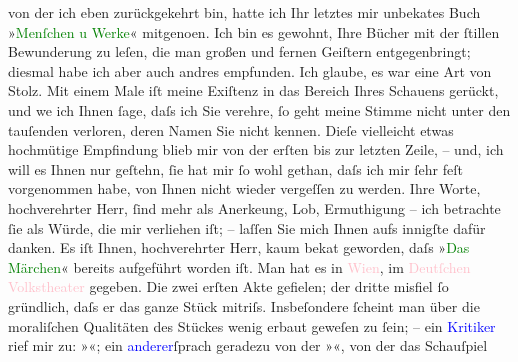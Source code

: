                     von der ich eben zurückgekehrt bin, hatte ich Ihr letztes mir unbeka{\geminationn}tes Buch »\textcolor{green}{Menſchen u
                        Werke}{}\ledrightnote{\textcolor{green}{Menschen und Werke}}« mitgeno{\geminationm}en. Ich bin es
                    gewohnt, Ihre Bücher mit der ſtillen Bewunderung zu leſen, die man großen und
                    fernen Geiſtern entgegen{\pb}bringt; diesmal
                    habe ich aber auch andres empfunden. Ich glaube, es war eine Art von Stolz. Mit
                    einem Male iſt meine Exiſtenz in das Bereich Ihres Schauens gerückt, und we{\geminationn} ich Ihnen ſage, daſs ich Sie verehre, ſo geht
                    meine Stimme nicht unter den tauſenden verloren, deren Namen Sie nicht kennen.
                    Dieſe vielleicht etwas hochmütige Empfindung blieb mir {\pb}von der erſten bis zur letzten Zeile, –
                    und, ich will es Ihnen nur geſtehn, ſie hat mir ſo wohl gethan, daſs ich mir
                    ſehr feſt vorgenommen habe, von Ihnen nicht wieder vergeſſen zu werden. Ihre
                    Worte, hochverehrter Herr, ſind mehr als Anerke{\geminationn}ung, Lob, Ermuthigung – ich betrachte ſie als Würde, die mir verliehen iſt; –
                    laſſen Sie mich Ihnen aufs innigſte dafür {\pb}danken.\pend
           \pstart
           Es iſt Ihnen, hochverehrter Herr, kaum beka{\geminationn}t
                    geworden, daſs »\textcolor{green}{Das Märchen}{}\ledrightnote{\textcolor{green}{Das Märchen. Schauspiel in drei Aufzügen}}« bereits
                    aufgeführt worden iſt. Man hat es in \textcolor{pink}{Wien}{}\ledrightnote{\textcolor{pink}{Wien}}, im
                        \textcolor{pink}{Deutſchen Volkstheater}{}\ledrightnote{\textcolor{pink}{Volkstheater}} gegeben. Die zwei
                    erſten Akte gefielen; der dritte misfiel ſo gründlich, daſs er das ganze Stück
                    mitriſs. Insbeſondere ſcheint man über die moraliſchen Qualitäten des Stückes
                    wenig erbaut geweſen zu ſein; – ein \textcolor{blue}{Kritiker}{} rief mir zu: »\label{K_L00336_1v}\label{K_L00336_1h}«; ein \textcolor{blue}{anderer}{}ſprach geradezu von der »\label{K_L00336_2v}\label{K_L00336_2h}«, von der das Schauſpiel
